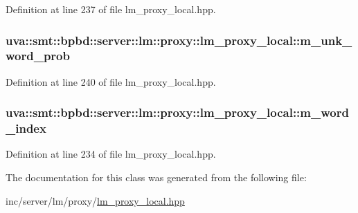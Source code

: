 Definition at line 237 of file lm\+\_\+proxy\+\_\+local.\+hpp.

\hypertarget{classuva_1_1smt_1_1bpbd_1_1server_1_1lm_1_1proxy_1_1lm__proxy__local_a429b9054d6edfc673d541cb957b52690}{}
\subsubsection[{m\+\_\+unk\+\_\+word\+\_\+prob}]{ uva\+::smt\+::bpbd\+::server\+::lm\+::proxy\+::lm\+\_\+proxy\+\_\+local\+::m\+\_\+unk\+\_\+word\+\_\+prob\hspace{0.3cm}{\ttfamily [protected]}}\label{classuva_1_1smt_1_1bpbd_1_1server_1_1lm_1_1proxy_1_1lm__proxy__local_a429b9054d6edfc673d541cb957b52690}


Definition at line 240 of file lm\+\_\+proxy\+\_\+local.\+hpp.

\hypertarget{classuva_1_1smt_1_1bpbd_1_1server_1_1lm_1_1proxy_1_1lm__proxy__local_a52e51098548cbedd08af9b5b6fc897c8}{}
\subsubsection[{m\+\_\+word\+\_\+index}]{ uva\+::smt\+::bpbd\+::server\+::lm\+::proxy\+::lm\+\_\+proxy\+\_\+local\+::m\+\_\+word\+\_\+index\hspace{0.3cm}{\ttfamily [protected]}}\label{classuva_1_1smt_1_1bpbd_1_1server_1_1lm_1_1proxy_1_1lm__proxy__local_a52e51098548cbedd08af9b5b6fc897c8}


Definition at line 234 of file lm\+\_\+proxy\+\_\+local.\+hpp.



The documentation for this class was generated from the following file\+:\begin{DoxyCompactItemize}
\item 
inc/server/lm/proxy/\hyperlink{lm__proxy__local_8hpp}{lm\+\_\+proxy\+\_\+local.\+hpp}\end{DoxyCompactItemize}
